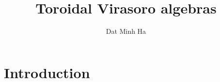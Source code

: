 

\setcounter{section}{-1}





    \title{Toroidal Virasoro algebras}
    
    \author{Dat Minh Ha}
    \maketitle
    
    \begin{abstract}
    
    \end{abstract}
    
    {
    \hypersetup{} 
    \tableofcontents %
    }

    \section{Introduction}

